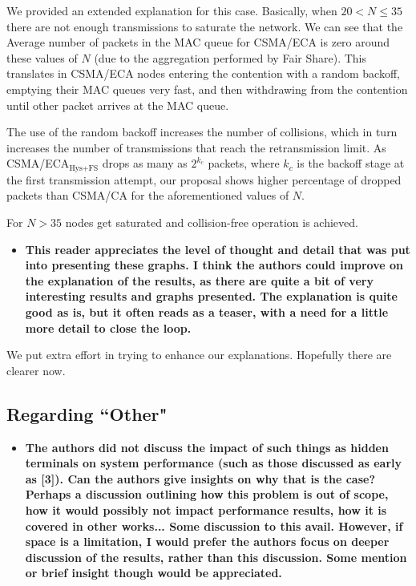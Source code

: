 \documentclass[]{article}
\begin{document}
		We provided an extended explanation for this case. Basically, when $20 < N \leq 35$ there are not enough transmissions to saturate the network. We can see that the Average number of packets in the MAC queue for CSMA/ECA is zero around these values of $N$ (due to the aggregation performed by Fair Share). This translates in CSMA/ECA nodes entering the contention with a random backoff, emptying their MAC queues very fast, and then withdrawing from the contention until other packet arrives at the MAC queue. 
		
		The use of the random backoff increases the number of collisions, which in turn increases the number of transmissions that reach the retransmission limit. As CSMA/ECA$_{\text{Hys+FS}}$ drops as many as $2^{k_{c}}$ packets, where $k_{c}$ is the backoff stage at the first transmission attempt, our proposal shows higher percentage of dropped packets than CSMA/CA for the aforementioned values of $N$.
		
		For $N>35$ nodes get saturated and collision-free operation is achieved.
		
		\begin{itemize}
			\item {\bfseries This reader appreciates the level of thought and detail that was put into presenting these graphs. I think the authors could improve on the explanation of the results, as there are quite a bit of very interesting results and graphs presented. The explanation is quite good as is, but it often reads as a teaser, with a need for a little more detail to close the loop.}
		\end{itemize}
		
		We put extra effort in trying to enhance our explanations. Hopefully there are clearer now.
		
	\subsection{Regarding ``Other"}
		\begin{itemize}
			\item {\bf The authors did not discuss the impact of such things as hidden terminals on system performance (such as those discussed as early as [3]). Can the authors give insights on why that is the case? Perhaps a discussion outlining how this problem is out of scope, how it would possibly not impact performance results, how it is covered in other works... Some discussion to this avail. However, if space is a limitation, I would prefer the authors focus on deeper discussion of the results, rather than this discussion. Some mention or brief insight though would be appreciated.}
		\end{itemize}
	
\end{document}

